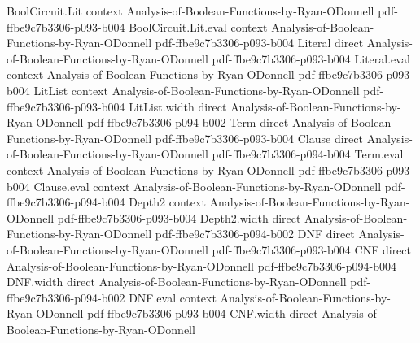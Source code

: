 \begin{theorem}
\leanok
{}
\proofstep
  {BoolCircuit.Lit}
  {context}
  {Analysis-of-Boolean-Functions-by-Ryan-ODonnell}
  {pdf-ffbe9c7b3306-p093-b004}
\proofstep
  {BoolCircuit.Lit.eval}
  {context}
  {Analysis-of-Boolean-Functions-by-Ryan-ODonnell}
  {pdf-ffbe9c7b3306-p093-b004}
\proofstep
  {Literal}
  {direct}
  {Analysis-of-Boolean-Functions-by-Ryan-ODonnell}
  {pdf-ffbe9c7b3306-p093-b004}
\proofstep
  {Literal.eval}
  {context}
  {Analysis-of-Boolean-Functions-by-Ryan-ODonnell}
  {pdf-ffbe9c7b3306-p093-b004}
\proofstep
  {LitList}
  {context}
  {Analysis-of-Boolean-Functions-by-Ryan-ODonnell}
  {pdf-ffbe9c7b3306-p093-b004}
\proofstep
  {LitList.width}
  {direct}
  {Analysis-of-Boolean-Functions-by-Ryan-ODonnell}
  {pdf-ffbe9c7b3306-p094-b002}
\proofstep
  {Term}
  {direct}
  {Analysis-of-Boolean-Functions-by-Ryan-ODonnell}
  {pdf-ffbe9c7b3306-p093-b004}
\proofstep
  {Clause}
  {direct}
  {Analysis-of-Boolean-Functions-by-Ryan-ODonnell}
  {pdf-ffbe9c7b3306-p094-b004}
\proofstep
  {Term.eval}
  {context}
  {Analysis-of-Boolean-Functions-by-Ryan-ODonnell}
  {pdf-ffbe9c7b3306-p093-b004}
\proofstep
  {Clause.eval}
  {context}
  {Analysis-of-Boolean-Functions-by-Ryan-ODonnell}
  {pdf-ffbe9c7b3306-p094-b004}
\proofstep
  {Depth2}
  {context}
  {Analysis-of-Boolean-Functions-by-Ryan-ODonnell}
  {pdf-ffbe9c7b3306-p093-b004}
\proofstep
  {Depth2.width}
  {direct}
  {Analysis-of-Boolean-Functions-by-Ryan-ODonnell}
  {pdf-ffbe9c7b3306-p094-b002}
\proofstep
  {DNF}
  {direct}
  {Analysis-of-Boolean-Functions-by-Ryan-ODonnell}
  {pdf-ffbe9c7b3306-p093-b004}
\proofstep
  {CNF}
  {direct}
  {Analysis-of-Boolean-Functions-by-Ryan-ODonnell}
  {pdf-ffbe9c7b3306-p094-b004}
\proofstep
  {DNF.width}
  {direct}
  {Analysis-of-Boolean-Functions-by-Ryan-ODonnell}
  {pdf-ffbe9c7b3306-p094-b002}
\proofstep
  {DNF.eval}
  {context}
  {Analysis-of-Boolean-Functions-by-Ryan-ODonnell}
  {pdf-ffbe9c7b3306-p093-b004}
\proofstep
  {CNF.width}
  {direct}
  {Analysis-of-Boolean-Functions-by-Ryan-ODonnell}

\end{theorem}
